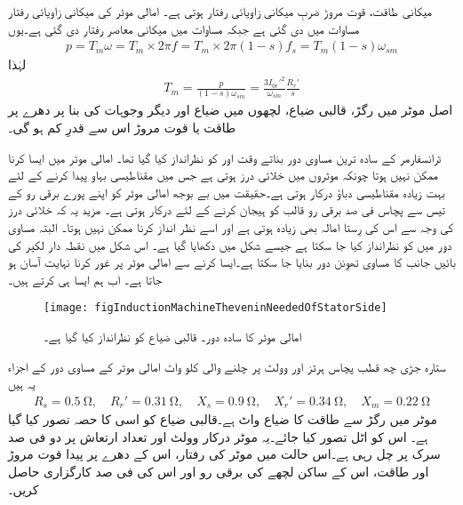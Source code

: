 میکانی طاقت، قوت مروڑ ضربِ میکانی زاویائی رفتار ہوتی ہے۔ امالی موٹر کی میکانی زاویائی رفتار مساوات   میں دی گئی ہے جبکہ مساوات   میں میکانی معاصر رفتار  دی گئی ہے۔یوں
\begin{align}\label{مساوات_امالی_تین_دور_میکانی_طاقت_اور_رفتار}
p= T_m \omega =T_m \times 2 \pi f=T_m \times 2 \pi (1-s) f_s=T_m (1-s) \omega_{sm} 
\end{align}
لہٰذا
\begin{align}\label{مساوات_امالی_مروڑ_الف}
T_m=\frac{p}{(1-s) \omega_{sm}}=\frac{3 I_{0r}'^2}{\omega_{sm}} \frac{R_r'}{s}
\end{align}
اصل موٹر میں رگڑ، قالبی ضیاع، لچھوں میں ضیاع اور دیگر وجوہات کی بنا پر دھرے پر طاقت یا قوت مروڑ اس سے قدرِ کم ہو گی۔

ٹرانسفارمر کے سادہ ترین مساوی دور بناتے وقت  اور  کو نظرانداز کیا گیا تھا۔ امالی موٹر میں ایسا کرنا ممکن نہیں ہوتا چونکہ موٹروں میں خلائی درز ہوتی ہے جس میں مقناطیسی بہاو پیدا کرنے کے لئے بہت زیادہ مقناطیسی دباؤ درکار ہوتی ہے۔حقیقت میں بے بوجھ امالی موٹر کو اپنے پورے برقی رو کے تیس سے پچاس فی صد برقی رو قالب کو ہیجان کرنے کے لئے درکار ہوتی ہے۔ مزید یہ کہ خلائی درز کی وجہ سے اس کی رِستا امالہ بھی زیادہ ہوتی ہے اور اسے نظر انداز کرنا ممکن نہیں ہوتا۔ البتہ مساوی دور میں  کو نظرانداز کیا جا سکتا ہے جیسے شکل  میں دکھایا گیا ہے۔ اس شکل میں نقطہ دار لکیر کی بائیں جانب کا مساوی تھوِنن دور بنایا جا سکتا ہے۔ایسا کرنے سے امالی موٹر پر غور کرنا نہایت آسان ہو جاتا ہے۔ اب ہم ایسا ہی کرتے ہیں۔
\begin{figure}
\centering
\texttt{[image: figInductionMachineTheveninNeededOfStatorSide]}
\caption{امالی موٹر کا سادہ دور۔ قالبی ضیاع کو نظرانداز کیا گیا ہے۔}
\label{شکل_امالی_ساکن_حصے_کا_تھونن_دور}
\end{figure}
%
ستارہ جڑی چھ قطب پچاس ہرٹز اور   وولٹ پر چلنے والی   کلو واٹ امالی موٹر کے مساوی دور کے اجزاء یہ ہیں
\begin{align*}
R_s= \SI{0.5}{\ohm}, \quad R_r'=\SI{0.31}{\ohm}, \quad X_s=\SI{0.9}{\ohm}, \quad X_r'=\SI{0.34}{\ohm}, \quad X_m=\SI{0.22}{\ohm} 
\end{align*}
موٹر میں رگڑ سے طاقت کا ضیاع   واٹ ہے۔قالبی ضیاع کو اسی کا حصہ تصور کیا گیا ہے۔ اس کو اٹل تصور کیا جائے۔یہ موٹر درکار وولٹ اور تعداد ارتعاش پر دو فی صد سرک پر چل رہی ہے۔اس حالت میں موٹر کی رفتار، اس کے دھرے پر پیدا قوت مروڑ اور طاقت، اس کے ساکن لچھے کی برقی رو اور اس کی فی صد کارگزاری حاصل کریں۔

